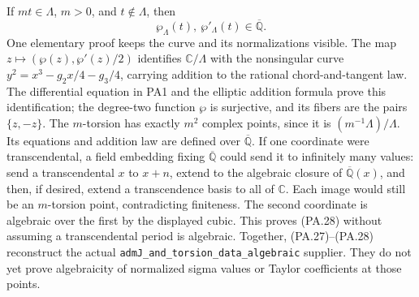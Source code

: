 If $mt\in\Lambda$, $m>0$, and $t\notin\Lambda$, then
\[
                        \wp_\Lambda(t),\ \wp'_\Lambda(t)
                              \in\overline{\mathbb Q}.         \tag{PA.28}
\]
One elementary proof keeps the curve and its normalizations
visible. The map $z\mapsto(\wp(z),\wp'(z)/2)$ identifies
$\mathbb C/\Lambda$ with the nonsingular curve
$y^2=x^3-g_2x/4-g_3/4$, carrying addition to the rational
chord-and-tangent law. The differential equation in PA1 and
the elliptic addition formula prove this identification; the
degree-two function $\wp$ is surjective, and its fibers are
the pairs $\{z,-z\}$. The $m$-torsion has exactly $m^2$ complex
points, since it is $(m^{-1}\Lambda)/\Lambda$.
Its equations and addition law are defined over
$\overline{\mathbb Q}$. If one coordinate were transcendental,
a field embedding fixing $\overline{\mathbb Q}$ could send it
to infinitely many values: send a transcendental $x$ to $x+n$,
extend to the algebraic closure of $\overline{\mathbb Q}(x)$,
and then, if desired, extend a transcendence basis to all of
$\mathbb C$. Each image would still be an $m$-torsion point,
contradicting finiteness. The second coordinate is algebraic
over the first by the displayed cubic. This proves (PA.28)
without assuming a transcendental period is algebraic.
Together, (PA.27)--(PA.28) reconstruct the actual
\texttt{admJ\_and\_torsion\_data\_algebraic} supplier.
They do not yet prove algebraicity of normalized sigma values
or Taylor coefficients at those points.

